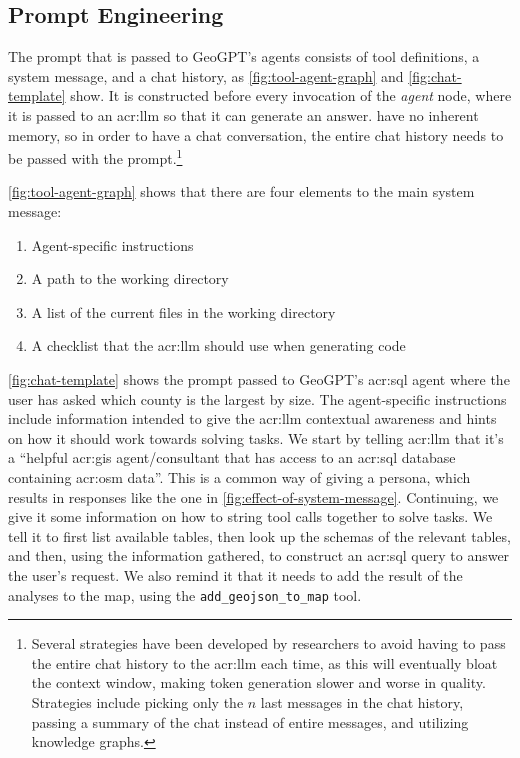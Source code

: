 \subsection{Prompt Engineering}
\label{subsec:prompt-engineering-architecture}

The prompt that is passed to GeoGPT's agents consists of tool definitions, a system message, and a chat history, as \autoref{fig:tool-agent-graph} and \autoref{fig:chat-template} show. It is constructed before every invocation of the \textit{agent} node, where it is passed to an \acrshort{acr:llm} so that it can generate an answer.  have no inherent memory, so in order to have a chat conversation, the entire chat history needs to be passed with the prompt.\footnote{Several strategies have been developed by researchers to avoid having to pass the entire chat history to the \acrshort{acr:llm} each time, as this will eventually bloat the context window, making token generation slower and worse in quality. Strategies include picking only the $n$ last messages in the chat history, passing a summary of the chat instead of entire messages, and utilizing knowledge graphs.}

\autoref{fig:tool-agent-graph} shows that there are four elements to the main system message:

\begin{enumerate}
    \item Agent-specific instructions
    \item A path to the working directory
    \item A list of the current files in the working directory
    \item A checklist that the \acrshort{acr:llm} should use when generating code
\end{enumerate}

\autoref{fig:chat-template} shows the prompt passed to GeoGPT's \acrshort{acr:sql} agent where the user has asked which county is the largest by size. The agent-specific instructions include information intended to give the \acrshort{acr:llm} contextual awareness and hints on how it should work towards solving tasks. We start by telling \acrshort{acr:llm} that it's a \enquote{helpful \acrshort{acr:gis} agent/consultant that has access to an \acrshort{acr:sql} database containing \acrlong{acr:osm} data}. This is a common way of giving  a persona, which results in responses like the one in \autoref{fig:effect-of-system-message}. Continuing, we give it some information on how to string tool calls together to solve tasks. We tell it to first list available tables, then look up the schemas of the relevant tables, and then, using the information gathered, to construct an \acrshort{acr:sql} query to answer the user's request. We also remind it that it needs to add the result of the analyses to the map, using the \texttt{add\_geojson\_to\_map} tool.

